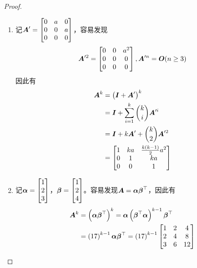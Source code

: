 \documentclass{ctexart}
\begin{document}
\begin{proof}
    \begin{enumerate}
        \item 记\(\boldsymbol{A}'=\begin{bmatrix}0&a&0\\0&0&a\\0&0&0\end{bmatrix}\)，容易发现
              \begin{equation*}
                  \boldsymbol{A}'^2=\begin{bmatrix}0&0&a^2\\0&0&0\\0&0&0\end{bmatrix},\boldsymbol{A}'^n=\boldsymbol{O}(n\ge3)
              \end{equation*}
              因此有
              \begin{align*}
                  \boldsymbol{A}^k & =\left( \boldsymbol{I}+\boldsymbol{A}' \right)^k                 \\
                          & =\boldsymbol{I}+\sum_{i=1}^k\binom{k}{i}\boldsymbol{A}'^i \\
                          & =\boldsymbol{I}+k\boldsymbol{A}'+\binom{k}{2}\boldsymbol{A}'^2     \\
                          & =\begin{bmatrix}
                      1 & ka & \frac{k(k-1)}{2}a^2 \\
                      0 & 1  & ka                  \\
                      0 & 0  & 1
                  \end{bmatrix}
              \end{align*}
        \item 记\(\boldsymbol{\alpha}=\begin{bmatrix}1\\2\\3\end{bmatrix}\)，\(\boldsymbol{\beta}=\begin{bmatrix}1\\2\\4\end{bmatrix}\)。容易发现\(\boldsymbol{A}=\boldsymbol{\alpha}\boldsymbol{\beta}^\top\)，因此有
              \begin{align*}
                  \boldsymbol{A}^k & =\left( \boldsymbol{\alpha}\boldsymbol{\beta}^\top \right)^k=\boldsymbol{\alpha}\left( \boldsymbol{\beta}^\top\boldsymbol{\alpha} \right)^{k-1}\boldsymbol{\beta}^\top \\
                          & =\left( 17 \right)^{k-1}\boldsymbol{\alpha}\boldsymbol{\beta}^\top=\left( 17 \right)^{k-1}
                  \begin{bmatrix}
                      1 & 2 & 4 \\2&4&8\\3&6&12
                  \end{bmatrix}
              \end{align*}
    \end{enumerate}
\end{proof}
\end{document}

